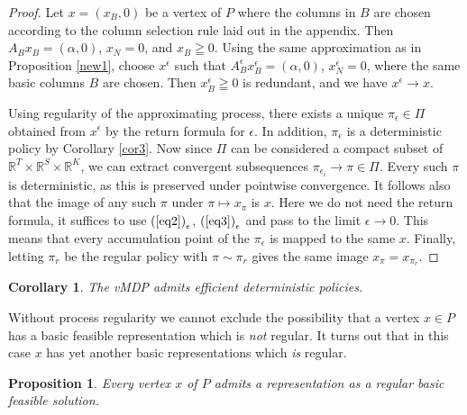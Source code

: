 \documentclass{article}
\newtheorem{corollary}[theorem]{Corollary}
\newtheorem{proposition}[theorem]{Proposition}
\theoremstyle{definition}
\numberwithin{equation}{section}
\begin{document}
\begin{proof}
    Let $x = (x_B, 0)$ be a vertex of $P$ where the columns in $B$ are chosen according to the column selection rule laid out in the appendix. %
    Then $A_Bx_B = (\alpha,0)$, $x_N=0$, and $x_B \geqq 0$. Using the same approximation as
in Proposition \ref{new1},
choose $x^\epsilon$ such that $A_B^\epsilon x_B^\epsilon = (\alpha,0)$, $x_N^\epsilon = 0$, where the same basic columns $B$ are chosen.
Then $x_B^\epsilon \geqq 0$ is redundant, and we have $x^\epsilon \to x$.

Using regularity of the approximating process,
there exists a unique $\pi_\epsilon \in \Pi$ obtained from $x^\epsilon$
by the return formula for $\epsilon$. In addition,  $\pi_\epsilon$ is a deterministic policy
by Corollary \ref{cor3}. Now since $\Pi$ can be considered a compact subset of 
$\mathbb R^T \times \mathbb R^S\times \mathbb R^K$, we can extract convergent subsequences
$\pi_{\epsilon_i} \to \pi \in \Pi$. Every such $\pi$ is deterministic, as this is preserved under
pointwise convergence. It follows also that the image of any such $\pi$ under $\pi \mapsto x_\pi$
is $x$. Here
we do not need the return formula, it suffices to use
${\rm (\ref{eq2})}_\epsilon$, ${\rm (\ref{eq3})}_\epsilon$
and pass to the limit $\epsilon \to 0$.  This means that every accumulation point of the $\pi_\epsilon$ is mapped to the same $x$. Finally, letting
$\pi_r$ be the regular policy with $\pi \sim \pi_r$ gives the same image $x_\pi = x_{\pi_r}$.
\end{proof}


\begin{corollary}
    The vMDP admits efficient deterministic policies.
\end{corollary}

Without process regularity we cannot exclude the possibility that a vertex $x\in P$
has a basic feasible representation which is {\it not} regular. %
It turns out that in this case $x$ has yet  another basic representations which {\it is} regular.




\begin{proposition}
\label{prop7}
    Every vertex $x$ of $P$ admits a representation as a regular basic feasible solution.
\end{proposition}
\end{document}
